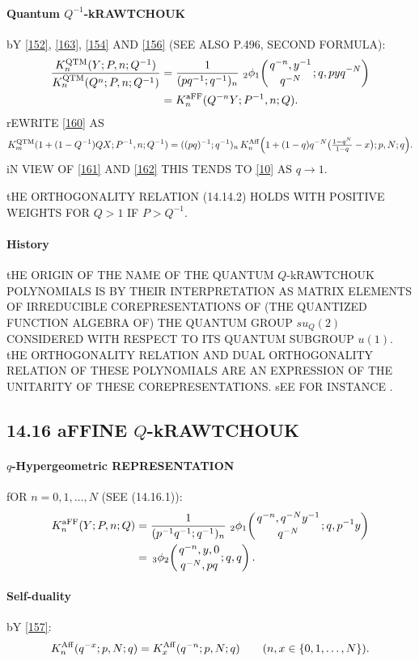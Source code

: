 \documentclass[twoside,11pt]{article}
\newcommand{\qhyp}[5]{\,\mbox{}_{#1}\phi_{#2}\!\left( 
  \genfrac{}{}{0pt}{}{#3}{#4};#5\right)}
\begin{document}
\paragraph{Quantum $Q^{-1}$-kRAWTCHOUK} 
bY \eqref{152}, \eqref{163}, \eqref{154} AND \eqref{156} 
(SEE ALSO P.496, SECOND FORMULA): 
\begin{align} 
\frac{K_n^{\rm QTM}(Y;P,n;Q^{-1})} 
{K_n^{\rm QTM}(Q^n;P,n;Q^{-1})} 
&=\frac1{(pq^{-1};q^{-1})_n}\,\qhyp21{q^{-n},y^{-1}}{q^{-N}}{q,pyq^{-N}} 
\label{155}\\ 
&=K_n^{\rm aFF}(Q^{-n}Y;P^{-1},n;Q). 
\label{160} 
\end{align} 
rEWRITE \eqref{160} AS 
\[ 
K_m^{\rm QTM}(1+(1-Q^{-1})QX;P^{-1},n;Q^{-1}) 
=((pq)^{-1};q^{-1})_n\,K_n^{\rm Aff}\Big(1+(1-q)q^{-N}\big(\tfrac{1-q^N}{1-q}-x\big);p,N;q\Big). 
\] 
iN VIEW OF \eqref{161} AND \eqref{162} THIS TENDS TO \eqref{10} AS $q\to1$. 
 
tHE ORTHOGONALITY RELATION (14.14.2) HOLDS WITH POSITIVE WEIGHTS FOR $Q>1$ 
IF $P>Q^{-1}$. 
% 
\paragraph{History} 
tHE ORIGIN OF THE NAME OF THE QUANTUM $Q$-kRAWTCHOUK POLYNOMIALS 
IS BY THEIR INTERPRETATION 
AS MATRIX ELEMENTS OF IRREDUCIBLE COREPRESENTATIONS OF (THE QUANTIZED 
FUNCTION ALGEBRA OF) THE QUANTUM GROUP $su_Q(2)$ CONSIDERED 
WITH RESPECT TO ITS QUANTUM SUBGROUP $u(1)$. tHE ORTHOGONALITY 
RELATION AND DUAL ORTHOGONALITY RELATION OF THESE POLYNOMIALS 
ARE AN EXPRESSION OF THE UNITARITY OF THESE COREPRESENTATIONS. 
sEE FOR INSTANCE . 
% 
\subsection*{14.16 aFFINE $Q$-kRAWTCHOUK} 
\label{sec14.16} 
% 
\paragraph{$q$-Hypergeometric REPRESENTATION} 
fOR $n=0,1,\ldots,N$ 
(SEE (14.16.1)): 
\begin{align} 
K_n^{\rm aFF}(Y;P,n;Q) 
&=\frac1{(p^{-1}q^{-1};q^{-1})_n}\,\qhyp21{q^{-n},q^{-N}y^{-1}}{q^{-N}}{q,p^{-1}y} 
\label{156}\\ 
&=\qhyp32{q^{-n},y,0}{q^{-N},pq}{q,q}. 
\label{157} 
\end{align} 
% 
\paragraph{Self-duality} 
bY \eqref{157}: 
\begin{equation} 
K_n^{\rm Aff}(q^{-x};p,N;q)=K_x^{\rm Aff}(q^{-n};p,N;q)\qquad 
(n,x\in\{0,1,\ldots,N\}). 
\label{168} 
\end{equation} 
% 
\end{document}
